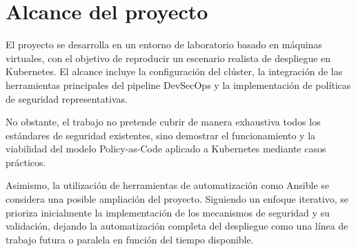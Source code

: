 \section{Alcance del proyecto}

El proyecto se desarrolla en un entorno de laboratorio basado en máquinas virtuales, con el objetivo de reproducir un escenario realista de despliegue en Kubernetes. El alcance incluye la configuración del clúster, la integración de las herramientas principales del pipeline DevSecOps y la implementación de políticas de seguridad representativas.

No obstante, el trabajo no pretende cubrir de manera exhaustiva todos los estándares de seguridad existentes, sino demostrar el funcionamiento y la viabilidad del modelo Policy-as-Code aplicado a Kubernetes mediante casos prácticos.

Asimismo, la utilización de herramientas de automatización como Ansible se considera una posible ampliación del proyecto. Siguiendo un enfoque iterativo, se prioriza inicialmente la implementación de los mecanismos de seguridad y su validación, dejando la automatización completa del despliegue como una línea de trabajo futura o paralela en función del tiempo disponible.